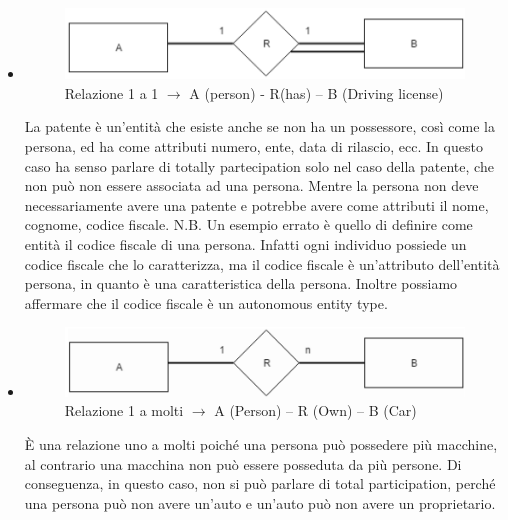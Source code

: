\begin{itemize}

\item

\begin{center}
\begin{figure}[H]
\centering
\includegraphics[scale=1]{figures/ER11.png}
\caption{Relazione 1 a 1 $\rightarrow$ A (person) - R(has) – B (Driving license)} 
\end{figure}
\end{center}

La patente è un’entità che esiste anche se non ha un possessore, così come la persona, ed ha come attributi numero, ente, data di rilascio, ecc. In questo caso ha senso parlare di totally partecipation solo nel caso della patente, che non può non essere associata ad una persona. Mentre la persona non deve necessariamente avere una patente e potrebbe avere come attributi il nome, cognome, codice fiscale. 
N.B. Un esempio errato è quello di definire come entità il codice fiscale di una persona. Infatti ogni individuo possiede un codice fiscale che lo caratterizza, ma il codice fiscale è un’attributo dell’entità persona, in quanto è una caratteristica della persona. Inoltre possiamo affermare che il codice fiscale è un autonomous entity type.

\item{}

\begin{center}
\begin{figure}[H]
\centering
\includegraphics[scale=1]{figures/ER1n.png}
\caption{Relazione 1 a molti $\rightarrow$ A (Person) – R (Own) – B (Car)} 
\end{figure}
\end{center}

È una relazione uno a molti poiché una persona può possedere più macchine, al contrario una macchina non può essere posseduta da più persone. Di conseguenza, in questo caso, non si può parlare di total participation, perché una persona può non avere un’auto e un’auto può non avere un proprietario.


\end{itemize}

